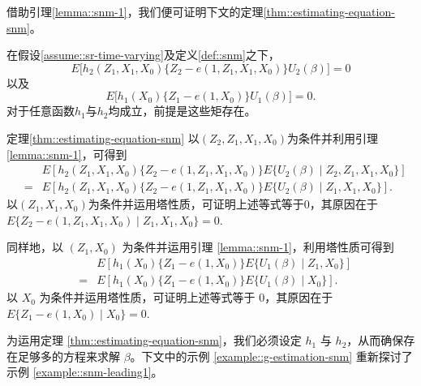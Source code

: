 借助引理\ref{lemma::snm-1}，我们便可证明下文的定理\ref{thm::estimating-equation-snm}。 

\begin{theorem}
\label{thm::estimating-equation-snm}
在假设\ref{assume::sr-time-varying}及定义\ref{def::snm}之下，
$$
E\Big[  h_2(Z_1, X_1, X_0)  \{ Z_2 - e(1, Z_1, X_1, X_0)  \}  U_2(\beta)   \Big] = 0
$$
以及
$$
E\Big[    h_1(X_0)  \{  Z_1 - e(1, X_0) \}  U_1(\beta) \Big] = 0 . 
$$
对于任意函数$h_1$与$h_2$均成立，前提是这些矩存在。 
\end{theorem}

 

\begin{myproof}{定理}{\ref{thm::estimating-equation-snm}}
以$(Z_2, Z_1, X_1, X_0)$为条件并利用引理\ref{lemma::snm-1}，可得到
\begin{eqnarray*}
&& E\left[  h_2(Z_1, X_1, X_0)  \{  Z_2 - e(1, Z_1, X_1, X_0)  \}   E\{U_2(\beta) \mid  Z_2, Z_1, X_1, X_0\}   \right] \\
&=& E\left[  h_2(Z_1, X_1, X_0)  \{  Z_2 - e(1, Z_1, X_1, X_0)  \}   E\{U_2(\beta) \mid  Z_1, X_1, X_0\}   \right] .
\end{eqnarray*}
以$( Z_1, X_1, X_0)$为条件并运用塔性质，可证明上述等式等于0，其原因在于$E\{  Z_2 - e(1, Z_1, X_1, X_0) \mid  Z_1, X_1, X_0\} = 0. $
 
同样地，以 $(Z_1, X_0)$ 为条件并运用引理 \ref{lemma::snm-1}，利用塔性质可得到
\begin{eqnarray*}
&& E\left[    h_1(X_0)   \{  Z_1 - e(1, X_0) \}  E \{U_1(  \beta) \mid Z_1, X_0\}  \right]  \\
&=& E\left[    h_1(X_0)   \{  Z_1 - e(1, X_0) \} E \{U_1(  \beta) \mid X_0\}  \right] .
 \end{eqnarray*}
以 $X_0$ 为条件并运用塔性质，可证明上述等式等于 0，其原因在于 $E\{  Z_1 - e(1, X_0) \mid X_0 \} = 0.$
\end{myproof}



为运用定理 \ref{thm::estimating-equation-snm}，我们必须设定 $h_1$ 与 $h_2$，从而确保存在足够多的方程来求解 $\beta$。下文中的示例 \ref{example::g-estimation-snm} 重新探讨了示例 \ref{example::snm-leading1}。 


